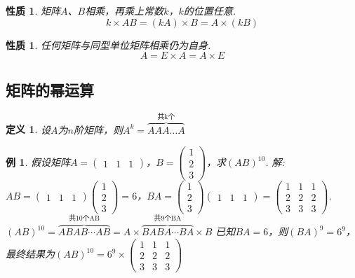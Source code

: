 \documentclass[12pt, a4paper, oneside]{ctexbook}
\newtheorem{definition}[theorem]{定义}
\newtheorem{example}[theorem]{例}
\newtheorem{quolity}[theorem]{性质}
\begin{document}
\begin{quolity}
    矩阵$A$、$B$相乘，再乘上常数$k$，$k$的位置任意. 
    $$k \times AB = (kA) \times B = A \times (kB)$$
\end{quolity}

\begin{quolity}
    任何矩阵与同型单位矩阵相乘仍为自身. 
    $$A = E \times A = A \times E$$
\end{quolity}

\subsection{矩阵的幂运算}

\begin{definition}
    设$A$为$n$阶矩阵，则$A^k = \overbrace{AAA \dots A}^{\mbox{共k个}}$
\end{definition}

\begin{example}
    假设矩阵$A= \left ( \begin{matrix}
        1 & 1 & 1
    \end{matrix} \right )$，$B= \left ( \begin{matrix}
        1 \\ 2 \\ 3
    \end{matrix} \right )$，求$(AB)^10$. 
    \newline
    解: $AB = \left ( \begin{matrix}
        1 & 1 & 1
    \end{matrix} \right ) \left ( \begin{matrix}
        1 \\ 2 \\ 3
    \end{matrix} \right ) = 6$，$BA = \left ( \begin{matrix}
        1 \\ 2 \\ 3
    \end{matrix} \right ) \left ( \begin{matrix}
        1 & 1 & 1
    \end{matrix} \right ) = \left ( \begin{matrix}
        1 & 1 & 1 \\
        2 & 2 & 2 \\
        3 & 3 & 3
    \end{matrix} \right )$. 
    \newline
    $(AB)^{10} = \overbrace{ABAB \cdots AB}^{\mbox{共10个AB}} = A \times \overbrace{BABA \cdots BA}^{\mbox{共9个BA}} \times B$
    已知$BA=6$，则$(BA)^9 = 6^9$，最终结果为$(AB)^10 = 6^9 \times \left ( \begin{matrix}
        1 & 1 & 1 \\
        2 & 2 & 2 \\
        3 & 3 & 3
    \end{matrix} \right )$
\end{example}
\end{document}
